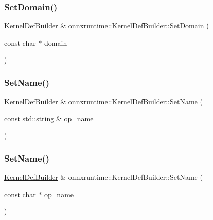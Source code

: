 \subsubsection{\texorpdfstring{Set\+Domain()}{SetDomain()}\hspace{0.1cm}{\footnotesize\ttfamily [2/2]}}
{\footnotesize\ttfamily \mbox{\hyperlink{classonnxruntime_1_1KernelDefBuilder}{Kernel\+Def\+Builder}} \& onnxruntime\+::\+Kernel\+Def\+Builder\+::\+Set\+Domain (\begin{DoxyParamCaption}\item[{const char $\ast$}]{domain }\end{DoxyParamCaption})}

\mbox{\label{classonnxruntime_1_1KernelDefBuilder_ac4a02dfb347cfbb63a8e38f3f89d87ec}} 
\subsubsection{\texorpdfstring{Set\+Name()}{SetName()}\hspace{0.1cm}{\footnotesize\ttfamily [1/2]}}
{\footnotesize\ttfamily \mbox{\hyperlink{classonnxruntime_1_1KernelDefBuilder}{Kernel\+Def\+Builder}} \& onnxruntime\+::\+Kernel\+Def\+Builder\+::\+Set\+Name (\begin{DoxyParamCaption}\item[{const std\+::string \&}]{op\+\_\+name }\end{DoxyParamCaption})}

\mbox{\label{classonnxruntime_1_1KernelDefBuilder_ac403e40ce7b634b7237d714163f806a6}} 
\subsubsection{\texorpdfstring{Set\+Name()}{SetName()}\hspace{0.1cm}{\footnotesize\ttfamily [2/2]}}
{\footnotesize\ttfamily \mbox{\hyperlink{classonnxruntime_1_1KernelDefBuilder}{Kernel\+Def\+Builder}} \& onnxruntime\+::\+Kernel\+Def\+Builder\+::\+Set\+Name (\begin{DoxyParamCaption}\item[{const char $\ast$}]{op\+\_\+name }\end{DoxyParamCaption})}

